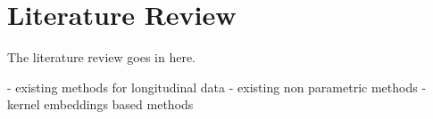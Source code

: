\chapter{Literature Review} \label{chap:litreview}

The literature review goes in here.

- existing methods for longitudinal data
- existing non parametric methods
- kernel embeddings based methods
